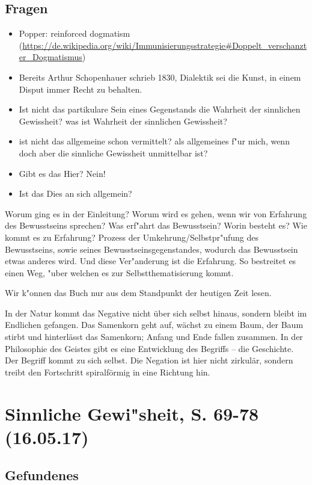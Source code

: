 \documentclass[emulatestandardclasses]{scrartcl}
\begin{document}
\subsection{Fragen}

\begin{itemize}
  \item Popper: reinforced dogmatism (\url{https://de.wikipedia.org/wiki/Immunisierungsstrategie#Doppelt_verschanzter_Dogmatismus})
  \item Bereits Arthur Schopenhauer schrieb 1830, Dialektik sei die Kunst, in einem Disput immer Recht zu behalten.
  \item Ist nicht das partikulare Sein eines Gegenstands die Wahrheit der sinnlichen Gewissheit? was ist Wahrheit der sinnlichen Gewissheit? 
  \item ist nicht das allgemeine schon vermittelt? als allgemeines f"ur mich, wenn doch aber die sinnliche Gewissheit unmittelbar ist?
  \item Gibt es das Hier? Nein!
  \item Ist das Dies an sich allgemein?
\end{itemize}

Worum ging es in der Einleitung? Worum wird es gehen, wenn wir von Erfahrung des Bewusstseins sprechen? Was erf"ahrt das Bewusstsein? Worin besteht es? Wie kommt es zu Erfahrung? Prozess der Umkehrung/Selbstpr"ufung des Bewusstseins, sowie seines Bewusstseinsgegenstandes, wodurch das Bewusstsein etwas anderes wird. Und diese Ver"anderung ist die Erfahrung. So bestreitet es einen Weg, "uber welchen es zur Selbstthematisierung kommt. 

Wir k"onnen das Buch nur aus dem Standpunkt der heutigen Zeit lesen. 

In der Natur kommt das Negative nicht über sich selbst hinaus, sondern bleibt im Endlichen gefangen. Das Samenkorn geht auf, wächst zu einem Baum, der Baum stirbt und hinterlässt das Samenkorn; Anfang und Ende fallen zusammen. In der Philosophie des Geistes gibt es eine Entwicklung des Begriffs – die Geschichte. Der Begriff kommt zu sich selbst. Die Negation ist hier nicht zirkulär, sondern treibt den Fortschritt spiralförmig in eine Richtung hin. 


\section{Sinnliche Gewi"sheit, S. 69-78\\(16.05.17)}

\subsection{Gefundenes}
\end{document}
